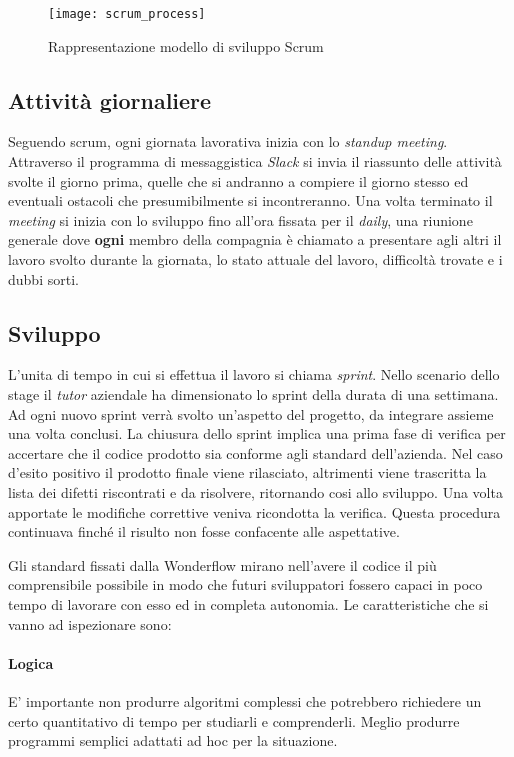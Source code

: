 \begin{figure}[ht]
\begin{center}
\texttt{[image: scrum\_process]}
\caption{Rappresentazione modello di sviluppo Scrum}
\label{fig:scrum_process}
\end{center}
\end{figure}

\subsection{Attività giornaliere}
Seguendo \gls{scrum}, ogni giornata lavorativa inizia con lo
\textit{standup meeting}. Attraverso il programma di messaggistica 
\textit{Slack} si invia il riassunto delle attività svolte il giorno prima,
quelle che si andranno a compiere il giorno stesso ed eventuali ostacoli che
presumibilmente si incontreranno. Una volta terminato il \textit{meeting} si 
inizia con lo sviluppo fino all'ora fissata per il \textit{daily}, una riunione 
generale dove \textbf{ogni} membro della compagnia è chiamato a presentare agli 
altri il lavoro svolto durante la giornata, lo stato attuale del lavoro, 
difficoltà trovate e i dubbi sorti.

\subsection{Sviluppo}
L'unita di tempo in cui si effettua il lavoro si chiama \textit{sprint}.
Nello scenario dello stage il \textit{tutor} aziendale ha dimensionato 
lo \gls{sprint} della durata di una settimana. Ad ogni nuovo \gls{sprint} 
verrà svolto un'aspetto del progetto, da integrare assieme una volta conclusi. 
La chiusura dello \gls{sprint} implica una prima fase di \gls{verifica} per 
accertare che il codice prodotto sia conforme agli standard dell'azienda. 
Nel caso d'esito positivo il prodotto finale viene rilasciato, altrimenti viene
trascritta la lista dei difetti riscontrati e da risolvere, ritornando cosi allo
sviluppo. Una volta apportate le modifiche correttive veniva ricondotta la 
verifica. Questa procedura continuava finché il risulto non fosse confacente 
alle aspettative.

Gli standard fissati dalla Wonderflow mirano nell'avere il codice il più
comprensibile possibile in modo che futuri sviluppatori fossero capaci in poco
tempo di lavorare con esso ed in completa autonomia. Le caratteristiche che si
vanno ad ispezionare sono:
\paragraph{Logica}
E' importante non produrre algoritmi complessi che potrebbero richiedere un
certo quantitativo di tempo per studiarli e comprenderli. Meglio produrre
programmi semplici adattati ad hoc per la situazione.

